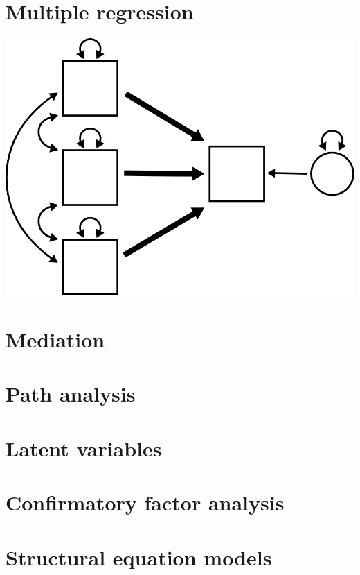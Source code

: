 \documentclass[
]{book}
\begin{document}
\hypertarget{multiple}{%
\chapter{Multiple regression}\label{multiple}}

\begin{center}\includegraphics{graphics/multiple_regression} \end{center}

\hypertarget{mediation}{%
\chapter{Mediation}\label{mediation}}

\hypertarget{path-analysis}{%
\chapter{Path analysis}\label{path-analysis}}

\hypertarget{latent-variables}{%
\chapter{Latent variables}\label{latent-variables}}

\hypertarget{confirmatory-factor-analysis}{%
\chapter{Confirmatory factor analysis}\label{confirmatory-factor-analysis}}

\hypertarget{structural-equation-models}{%
\chapter{Structural equation models}\label{structural-equation-models}}
\end{document}

